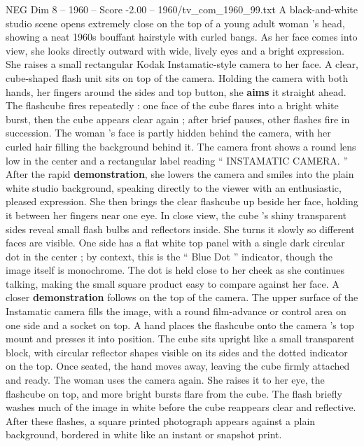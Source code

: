 \begin{textsample}{NEG Dim 8 – 1960 – Score -2.00 – 1960/tv\_com\_1960\_99.txt}  \label{ex:f8_neg_010}
A black-and-white studio scene opens extremely close on the top of a young adult woman ’s head, showing a neat 1960s bouffant hairstyle with curled bangs.
As her face comes into view, she looks directly outward with wide, lively eyes and a bright expression.
She raises a small rectangular Kodak Instamatic-style camera to her face.
A clear, cube-shaped flash unit sits on top of the camera.
Holding the camera with both hands, her fingers around the sides and top button, she \textbf{aims} it straight ahead.
The flashcube fires repeatedly : one face of the cube flares into a bright white burst, then the cube appears clear again ; after brief pauses, other flashes fire in succession.
The woman ’s face is partly hidden behind the camera, with her curled hair filling the background behind it.
The camera front shows a round lens low in the center and a rectangular label reading “ INSTAMATIC CAMERA. ” After the rapid \textbf{demonstration}, she lowers the camera and smiles into the plain white studio background, speaking directly to the viewer with an enthusiastic, pleased expression.
She then brings the clear flashcube up beside her face, holding it between her fingers near one eye.
In close view, the cube ’s shiny transparent sides reveal small flash bulbs and reflectors inside.
She turns it slowly so different faces are visible.
One side has a flat white top panel with a single dark circular dot in the center ; by context, this is the “ Blue Dot ” indicator, though the image itself is monochrome.
The dot is held close to her cheek as she continues talking, making the small square product easy to compare against her face.
A closer \textbf{demonstration} follows on the top of the camera.
The upper surface of the Instamatic camera fills the image, with a round film-advance or control area on one side and a socket on top.
A hand places the flashcube onto the camera ’s top mount and presses it into position.
The cube sits upright like a small transparent block, with circular reflector shapes visible on its sides and the dotted indicator on the top.
Once seated, the hand moves away, leaving the cube firmly attached and ready.
The woman uses the camera again.
She raises it to her eye, the flashcube on top, and more bright bursts flare from the cube.
The flash briefly washes much of the image in white before the cube reappears clear and reflective.
After these flashes, a square printed photograph appears against a plain background, bordered in white like an instant or snapshot print.

\end{textsample}
